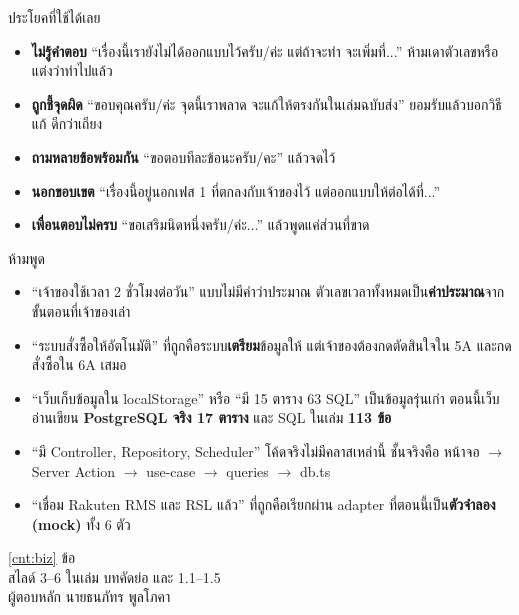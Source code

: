 \documentclass[12pt,a4paper]{article}
\newcommand{\speakerA}{นายธนภัทร พูลโภคา}
\newcounter{tq}
\newcommand{\topic}[5]{%
  \clearpage\colorlet{cur}{#1}\setcounter{tq}{0}%
  \begin{tcolorbox}[enhanced,colback=#1,colframe=#1,arc=4pt,left=10pt,right=10pt,top=8pt,bottom=8pt]
    \color{white}{\heavy\huge #3}\hfill{\Large \ref{cnt:#2} ข้อ}\\[2pt]
    {\large #4}\\[1pt]{\normalsize ผู้ตอบหลัก #5}
  \end{tcolorbox}\vspace{2pt}}
\begin{document}
{\heavy\Large ประโยคที่ใช้ได้เลย}\par
\begin{itemize}
  \item \textbf{ไม่รู้คำตอบ} ``เรื่องนี้เรายังไม่ได้ออกแบบไว้ครับ/ค่ะ แต่ถ้าจะทำ จะเพิ่มที่...'' ห้ามเดาตัวเลขหรือแต่งว่าทำไปแล้ว
  \item \textbf{ถูกชี้จุดผิด} ``ขอบคุณครับ/ค่ะ จุดนี้เราพลาด จะแก้ให้ตรงกันในเล่มฉบับส่ง'' ยอมรับแล้วบอกวิธีแก้ ดีกว่าเถียง
  \item \textbf{ถามหลายข้อพร้อมกัน} ``ขอตอบทีละข้อนะครับ/คะ'' แล้วจดไว้
  \item \textbf{นอกขอบเขต} ``เรื่องนี้อยู่นอกเฟส 1 ที่ตกลงกับเจ้าของไว้ แต่ออกแบบให้ต่อได้ที่...''
  \item \textbf{เพื่อนตอบไม่ครบ} ``ขอเสริมนิดหนึ่งครับ/ค่ะ...'' แล้วพูดแค่ส่วนที่ขาด
\end{itemize}

{\heavy\Large ห้ามพูด}\par
\begin{tcolorbox}[colback=ink!6,colframe=ink!6,arc=4pt]
\begin{itemize}
  \item ``เจ้าของใช้เวลา 2 ชั่วโมงต่อวัน'' แบบไม่มีคำว่าประมาณ ตัวเลขเวลาทั้งหมดเป็น\textbf{ค่าประมาณ}จากขั้นตอนที่เจ้าของเล่า
  \item ``ระบบสั่งซื้อให้อัตโนมัติ'' ที่ถูกคือระบบ\textbf{เตรียม}ข้อมูลให้ แต่เจ้าของต้องกดตัดสินใจใน 5A และกดสั่งซื้อใน 6A เสมอ
  \item ``เว็บเก็บข้อมูลใน localStorage'' หรือ ``มี 15 ตาราง 63 SQL'' เป็นข้อมูลรุ่นเก่า ตอนนี้เว็บอ่านเขียน \textbf{PostgreSQL จริง 17 ตาราง} และ SQL ในเล่ม \textbf{113 ข้อ}
  \item ``มี Controller, Repository, Scheduler'' โค้ดจริงไม่มีคลาสเหล่านี้ ชั้นจริงคือ หน้าจอ $\rightarrow$ Server Action $\rightarrow$ use-case $\rightarrow$ queries $\rightarrow$ db.ts
  \item ``เชื่อม Rakuten RMS และ RSL แล้ว'' ที่ถูกคือเรียกผ่าน adapter ที่ตอนนี้เป็น\textbf{ตัวจำลอง (mock)} ทั้ง 6 ตัว
\end{itemize}
\end{tcolorbox}

\topic{sA}{biz}{1. ธุรกิจ ปัญหา ขอบเขต}{สไลด์ 3--6  ในเล่ม บทคัดย่อ และ 1.1--1.5}{\speakerA}
\end{document}
